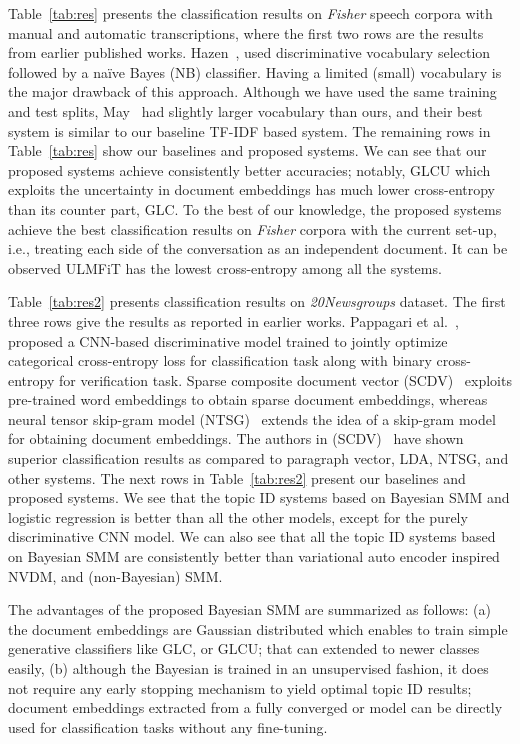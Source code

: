 \documentclass[journal]{IEEEtran}
\begin{document}
Table~\ref{tab:res} presents the classification results on \textit{Fisher} 
speech corpora with manual and automatic transcriptions, where the first two 
rows are the results from earlier published works.
Hazen~\cite{Hazen:2007:ASRU}, used  discriminative vocabulary selection
followed by a na\"ive Bayes (NB) classifier. Having a limited (small) 
vocabulary is the major drawback of this approach. Although we have used the 
same training and test splits, May~\cite{May:2015:mivec} had slightly larger 
vocabulary than ours, and their best system is similar to our baseline TF-IDF
based system. The remaining rows in Table~\ref{tab:res} show our baselines 
and proposed systems. We can see that our proposed systems achieve 
consistently better accuracies; notably, GLCU which exploits the uncertainty in 
document embeddings has much lower cross-entropy than its counter part, GLC. To 
the best of our knowledge, the proposed systems achieve the best classification 
results on \textit{Fisher} corpora with the current set-up, i.e., treating each 
side of the conversation as an independent document. It can be observed ULMFiT 
has the lowest cross-entropy among all the systems.

Table~\ref{tab:res2} presents classification results on 
\textit{20Newsgroups} dataset. The first three rows give the results as 
reported in earlier works. Pappagari et al.~\cite{Raghu:2018:CNN}, proposed a 
CNN-based discriminative model trained to jointly optimize categorical 
cross-entropy loss for classification task along with binary cross-entropy 
for verification task. Sparse composite document vector 
(SCDV)~\cite{Mekala:2017:SCDV} exploits pre-trained word embeddings to obtain 
sparse document embeddings, whereas neural tensor skip-gram model
(NTSG)~\cite{Liu:2015:NTSG} extends the idea of a skip-gram model for
obtaining document embeddings. The authors in (SCDV)~\cite{Mekala:2017:SCDV} 
have shown superior classification results as compared to paragraph vector, 
LDA, NTSG, and other systems. The next rows in Table~\ref{tab:res2} present our 
baselines and proposed systems. We see that the topic ID systems based on 
Bayesian SMM and logistic regression is better than all the other models, 
except for the purely discriminative CNN model. We can also see that all the 
topic ID systems based on Bayesian SMM are consistently better than variational 
auto encoder inspired NVDM, and (non-Bayesian) SMM. 

The advantages of the proposed Bayesian SMM are summarized as follows: (a) the 
document embeddings are Gaussian distributed which enables to train simple  
generative classifiers like GLC, or GLCU; that can extended to newer classes 
easily, (b) although the Bayesian is trained in an unsupervised fashion, it 
does not require any early stopping mechanism to yield optimal topic ID 
results; document embeddings extracted from a fully converged or model can be  
directly used for classification tasks without any fine-tuning.
\end{document}
